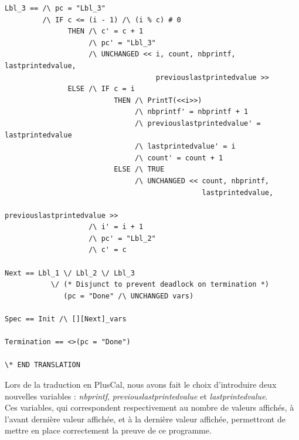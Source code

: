 \documentclass{scrreprt}
\begin{document}
\begin{lstlisting}
Lbl_3 == /\ pc = "Lbl_3"
         /\ IF c <= (i - 1) /\ (i % c) # 0
               THEN /\ c' = c + 1
                    /\ pc' = "Lbl_3"
                    /\ UNCHANGED << i, count, nbprintf, lastprintedvalue, 
                                    previouslastprintedvalue >>
               ELSE /\ IF c = i
                          THEN /\ PrintT(<<i>>)
                               /\ nbprintf' = nbprintf + 1
                               /\ previouslastprintedvalue' = lastprintedvalue
                               /\ lastprintedvalue' = i
                               /\ count' = count + 1
                          ELSE /\ TRUE
                               /\ UNCHANGED << count, nbprintf, 
                                               lastprintedvalue, 
                                               previouslastprintedvalue >>
                    /\ i' = i + 1
                    /\ pc' = "Lbl_2"
                    /\ c' = c

Next == Lbl_1 \/ Lbl_2 \/ Lbl_3
           \/ (* Disjunct to prevent deadlock on termination *)
              (pc = "Done" /\ UNCHANGED vars)

Spec == Init /\ [][Next]_vars

Termination == <>(pc = "Done")

\* END TRANSLATION
\end{lstlisting}

Lors de la traduction en PlusCal, nous avons fait le choix d'introduire deux nouvelles variables : \emph{nbprintf}, \emph{previouslastprintedvalue} et \emph{lastprintedvalue}. 
\\
Ces variables, qui correspondent respectivement au nombre de valeurs affichés, à l'avant dernière valeur affichée, et à la dernière valeur affichée, permettront de mettre en place correctement la preuve de ce programme.
\end{document}
